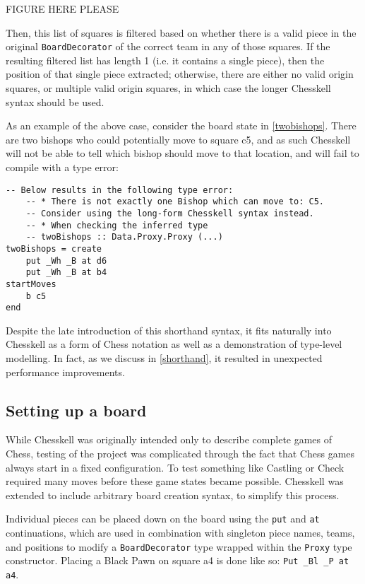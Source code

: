 \documentclass[12pt, a4paper, bibliography=totocnumbered]{scrreprt}
\newcommand{\inline}[1]{\lstinline[basicstyle=\ttfamily\footnotesize]{#1}}
\begin{document}
FIGURE HERE PLEASE %

Then, this list of squares is filtered based on whether there is a valid piece in the original \inline{BoardDecorator} of the correct team in any of those squares. If the resulting filtered list has length 1 (i.e. it contains a single piece), then the position of that single piece extracted; otherwise, there are either no valid origin squares, or multiple valid origin squares, in which case the longer Chesskell syntax should be used.

As an example of the above case, consider the board state in \cref{twobishops}. There are two bishops who could potentially move to square c5, and as such Chesskell will not be able to tell which bishop should move to that location, and will fail to compile with a type error:

\begin{lstlisting}
-- Below results in the following type error:
    -- * There is not exactly one Bishop which can move to: C5.
    -- Consider using the long-form Chesskell syntax instead.
    -- * When checking the inferred type
    -- twoBishops :: Data.Proxy.Proxy (...)
twoBishops = create
    put _Wh _B at d6
    put _Wh _B at b4
startMoves
    b c5
end
\end{lstlisting}

Despite the late introduction of this shorthand syntax, it fits naturally into Chesskell as a form of Chess notation as well as a demonstration of type-level modelling. In fact, as we discuss in \cref{shorthand}, it resulted in unexpected performance improvements.

\subsection{Setting up a board}

While Chesskell was originally intended only to describe complete games of Chess, testing of the project was complicated through the fact that Chess games always start in a fixed configuration. To test something like Castling or Check required many moves before these game states became possible. Chesskell was extended to include arbitrary board creation syntax, to simplify this process.

Individual pieces can be placed down on the board using the \inline{put} and \inline{at} continuations, which are used in combination with singleton piece names, teams, and positions to modify a \inline{BoardDecorator} type wrapped within the \inline{Proxy} type constructor. Placing a Black Pawn on square a4 is done like so: \inline{Put _Bl _P at a4}.
\end{document}
